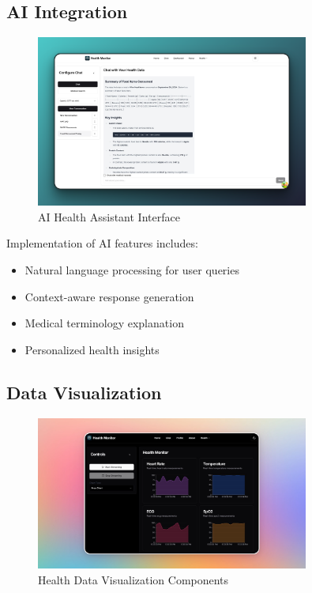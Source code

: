 \subsection{AI Integration}
\begin{figure}[H]
    \centering
    \includegraphics[width=0.8\textwidth]{public/landing/hm-chat-light.png}
    \caption{AI Health Assistant Interface}
\end{figure}

Implementation of AI features includes:
\begin{itemize}
    \item Natural language processing for user queries
    \item Context-aware response generation
    \item Medical terminology explanation
    \item Personalized health insights
\end{itemize}

\subsection{Data Visualization}
\begin{figure}[H]
    \centering
    \includegraphics[width=0.8\textwidth]{public/landing/hm-graphs.png}
    \caption{Health Data Visualization Components}
\end{figure}


